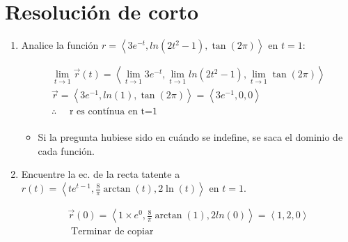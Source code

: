 % 
% 


\section{Resolución de corto}
\begin{enumerate}
    \item Analice la función $r=\left\langle 3e^{-t},ln(2t^2-1),\tan(2\pi ) \right\rangle $ en $t=1$:
        \begin{center}
           \begin{align*}
               \lim_{t \to 1} \vec{r}(t) = \left\langle \lim_{t \to 1} 3e^{-t},\lim_{t \to 1} ln(2t^2-1),\lim_{t \to 1} \tan(2\pi ) \right\rangle \\ 
               \vec{r} = \left\langle 3e^{-1},ln(1),\tan(2\pi) \right\rangle  = \left\langle 3e^{-1},0,0 \right\rangle \\
               \therefore \quad \text{  r es contínua en t=1  } \\   
           \end{align*}
           \begin{itemize}[label=\#]
               \item Si la pregunta hubiese sido en cuándo se indefine, se saca el dominio de cada función.
           \end{itemize}
        \end{center}
    
    \item Encuentre la ec. de la recta tatente a $r(t)= \left\langle te^{t-1},\frac{8}{\pi } \arctan(t), 2\ln(t) \right\rangle $ en $t=1$.
        \begin{center}
           \begin{align*}
               \vec{r}(0) = \left\langle 1\times e^0,\frac{8}{\pi } \arctan(1), 2ln(0) \right\rangle = \left\langle 1,2,0 \right\rangle \\ 
            \text{  Terminar de copiar  } \\ 
           \end{align*}
        \end{center}
\end{enumerate}


